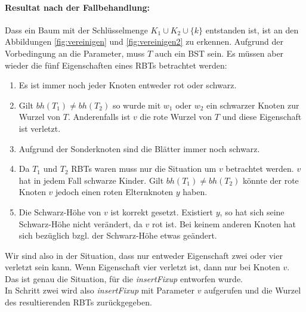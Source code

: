 \documentclass[a4paper,12pt]{article}
\begin{document}
\paragraph{Resultat nach der Fallbehandlung:}
Dass ein Baum mit der Schlüsselmenge  $K_1 \cup K_2 \cup \{k\} $ entstanden ist, ist an den Abbildungen \ref{fig:vereinigen} und \ref{fig:vereinigen2} zu erkennen. Aufgrund der Vorbedingung an die Parameter, muss $T$ auch ein BST sein. Es müssen aber wieder die fünf Eigenschaften eines RBTs betrachtet werden:
\begin{enumerate}
	\item Es ist immer noch jeder Knoten entweder rot oder schwarz.
	\item Gilt $bh(T_1) \neq bh(T_2)$ so wurde mit $w_1$ oder $w_2$ ein schwarzer Knoten zur Wurzel von $T$. Anderenfalls ist $v$ die rote Wurzel von $T$ und diese Eigenschaft ist verletzt.   
	\item Aufgrund der Sonderknoten sind die Blätter immer noch schwarz.
	\item Da $T_1$ und $T_2$ RBTs waren muss nur die Situation um $v$ betrachtet werden. $v$ hat in jedem Fall schwarze Kinder. Gilt $bh(T_1) \neq bh(T_2)$ könnte der rote Knoten $v$ jedoch einen roten Elternknoten $y$ haben. 
	\item Die Schwarz-Höhe von $v$ ist korrekt gesetzt. Existiert $y$, so hat sich seine Schwarz-Höhe nicht verändert, da $v$ rot ist. Bei keinem anderen Knoten hat sich bezüglich bzgl. der Schwarz-Höhe etwas geändert. 
\end{enumerate} 
Wir sind also in der Situation, dass nur entweder Eigenschaft zwei oder vier verletzt sein kann. Wenn Eigenschaft vier verletzt ist, dann nur bei Knoten $v$. Das ist genau die Situation, für die \textit{insertFixup} entworfen wurde.\\
In Schritt zwei wird also \textit{insertFixup} mit Parameter $v$ aufgerufen und die Wurzel des resultierenden RBTs zurückgegeben. 
\end{document}
